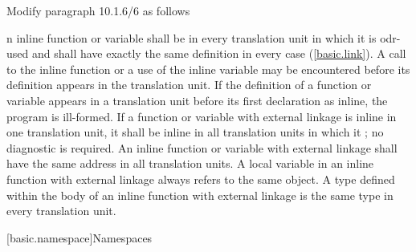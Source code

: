 \noindent
Modify paragraph 10.1.6/6 as follows
\begin{std.txt}
  \resetalinea[5]
  \alinea
  n inline function or variable shall be 
   in every translation 
  unit in which it is odr-used and  shall have exactly 
  the same definition in every case (\ref{basic.link}).
  \enternote
  A call to the inline function or a use of 
  the inline variable may be encountered before its definition appears 
  in the translation unit.
  \exitnote
  If the definition of a function or variable appears in a translation unit 
  before its first declaration as inline, the program is ill-formed. If a 
  function or variable with external  linkage is 
  inline  in one translation 
  unit, it shall be  inline
   in all translation units in which it 
  ; 
  no diagnostic is required. An inline function or variable with 
  external  linkage 
  shall have the same address in all translation units.
  \enternote
  A  local variable in an inline function with external 
   linkage always refers to the same object. A type 
  defined within the body 
  of an inline function with external  linkage is the 
  same type in every translation unit.
  \exitnote
\end{std.txt}




\setcounter{section}{2}
[basic.namespace]{Namespaces}%

